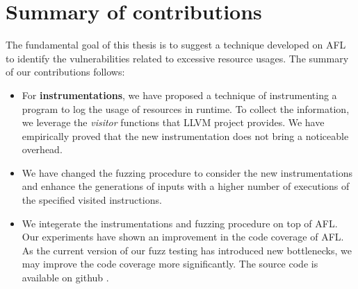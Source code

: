 \section{Summary of contributions}
\label{sec:1.2}

The fundamental goal of this thesis is to suggest a technique developed on AFL to identify the vulnerabilities related to excessive resource usages. The summary of our contributions follows:


\begin{itemize}
    \item For \textbf{instrumentations}, we have proposed a technique of instrumenting a program to log the usage of resources in runtime. To collect the information, we leverage the \textit{visitor} functions that LLVM project provides. We have empirically proved that the new instrumentation does not bring a noticeable overhead.
    
    \item We have changed the fuzzing procedure to consider the new instrumentations and enhance the generations of inputs with a higher number of executions of the specified visited instructions.
    
    \item We integerate the instrumentations and fuzzing procedure on top of AFL. Our experiments have shown an improvement in the code coverage of AFL. As the current version of our fuzz testing has introduced new bottlenecks, we may improve the code coverage more significantly. The source code is available on github \cite{wafl_git}.
\end{itemize}